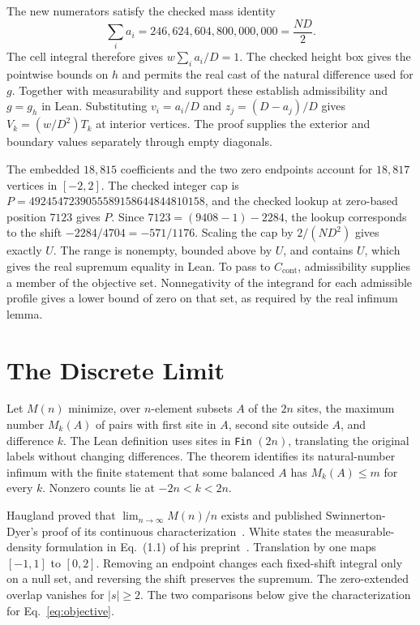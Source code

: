 \documentclass[sigplan,10pt,anonymous,review,balance=false]{acmart}
\newcommand{\ct}{C_{\mathrm{cont}}}
\newcommand{\leanid}[1]{\texttt{#1}}
\begin{document}
The new numerators satisfy the checked mass identity
\[
 \sum_i a_i=246{,}624{,}604{,}800{,}000{,}000=\frac{ND}{2}.
\] The cell integral therefore gives
$w\sum_i a_i/D=1$. The checked height box gives the pointwise
bounds on $h$ and permits the real cast of the natural
difference used for $g$. Together with measurability and support
these establish admissibility and $g=g_h$ in Lean. Substituting
$v_i=a_i/D$ and $z_j=(D-a_j)/D$ gives
$V_k=(w/D^2)T_k$ at interior vertices. The proof supplies the
exterior and boundary values separately through empty diagonals.

The embedded $18{,}815$ coefficients and the two zero endpoints
account for $18{,}817$ vertices in $[-2,2]$. The checked integer
cap is $P=4924547239055589158644844810158$, and the checked
lookup at zero-based position $7123$ gives $P$.
Since $7123=(9408-1)-2284$, the lookup corresponds to the
shift $-2284/4704=-571/1176$. Scaling the cap by
$2/(ND^2)$ gives exactly $U$. The range is nonempty, bounded
above by $U$, and contains $U$, which gives the real supremum
equality in Lean. To pass to $\ct$, admissibility supplies a
member of the objective set. Nonnegativity of the integrand for
each admissible profile gives a lower bound of zero on that set,
as required by the real infimum lemma.

\section{The Discrete Limit}
\label{sec:scope}

Let $M(n)$ minimize, over $n$-element subsets $A$ of the $2n$
sites, the maximum number $M_k(A)$ of pairs with first site in
$A$, second site outside $A$, and difference $k$. The Lean
definition uses sites in \leanid{Fin} $(2n)$, translating the
original labels without changing differences. The theorem
 identifies its natural-number
infimum with the finite statement that some balanced $A$ has
$M_k(A)\le m$ for every $k$. Nonzero counts lie at $-2n<k<2n$.

Haugland proved that $\lim_{n\to\infty}M(n)/n$ exists and
published Swinnerton-Dyer's proof of its continuous
characterization~\cite{Haugland1996}. White states the measurable-density
formulation in Eq.~(1.1) of his preprint~\cite{White2023}.
Translation by one maps $[-1,1]$ to $[0,2]$. Removing an endpoint
changes each fixed-shift integral only on a null set, and reversing the
shift preserves the supremum. The zero-extended overlap vanishes
for $|s|\ge2$. The two comparisons below give the characterization
for Eq.~\eqref{eq:objective}.
\end{document}
